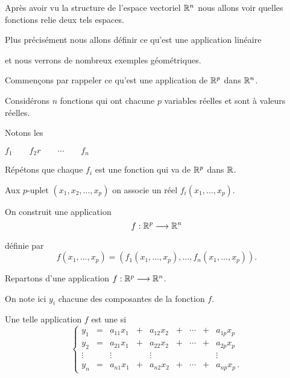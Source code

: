 







\debuttexte


\diapo

\change

Après avoir vu la structure de l'espace vectoriel $\mathbb{R}^n$
nous allons voir quelles fonctions relie deux tels espaces.

\change
Plus précisément nous allons définir ce qu'est une application linéaire

\change
et nous verrons de nombreux exemples géométriques.


\diapo

Commençons par rappeler ce qu'est une application de $\mathbb{R}^p$ dans $\mathbb{R}^n$.

\change

Considérons $n$ fonctions qui ont chacune $p$ variables 
réelles et sont à valeurs réelles.

Notons les 

$f_1 \qquad f_2r \qquad \cdots \qquad f_n $

\change

Répétons que chaque $f_i$ est une fonction qui va de $\mathbb{R}^p$ dans $\mathbb{R}$.

Aux $p$-uplet $(x_1,x_2,\ldots,x_p)$ on associe un réel $f_i(x_1,\ldots,x_p)$.

\change
On construit une application
$$f : \mathbb{R}^p \longrightarrow \mathbb{R}^n$$

\change
définie par
$$f(x_1,\dots , x_p)  = \left(f_1 (x_1, \dots , x_p), \dots , f_n (x_1, \dots , x_p)\right).$$


\diapo

Repartons d'une application $f: \mathbb{R}^p  \longrightarrow \mathbb{R}^n$.

On note ici $y_i$ chacune des composantes de la fonction $f$.


Une telle application $f$
est une  si 
 $$ 
 \left\{
\begin{array}{ccccccccc}
y_1 & = &a_{11}x_1 &+ &a_{12} x_2 & + & \cdots & + & a_{1p}x_p\\
y_2 & = & a_{21} x_1 & + & a_{22} x_2 & + & \cdots & + & a_{2p} x_p\\
\vdots &&\vdots &&\vdots & & & &\vdots\\
y_n & = & a_{n1}x_1 & + & a_{n2}x_2 &+&\cdots & +& a_{np} x_p\, .
\end{array}\right.
$$

